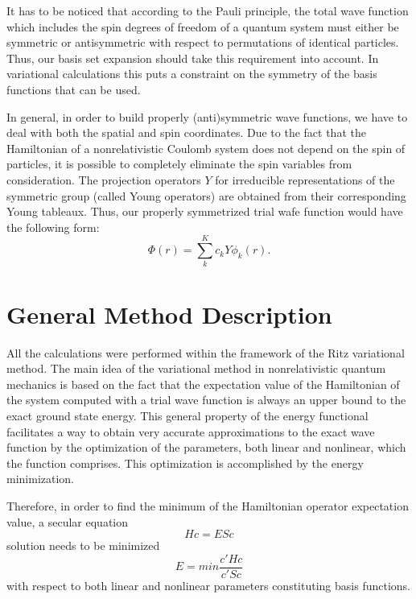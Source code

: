 It has to be noticed that according to the Pauli principle, the total wave function
which includes the spin degrees of freedom of a quantum system must either be symmetric 
or antisymmetric with respect to permutations of identical particles. 
Thus, our basis set expansion should take this requirement into account. 
In variational calculations this puts a constraint on the symmetry of the basis 
functions that can be used. 

In general, in order to build properly (anti)symmetric wave functions, we have to deal 
with both the spatial and spin coordinates. Due to the fact that the Hamiltonian of a
nonrelativistic Coulomb system does not depend on the spin of particles, it is possible 
to completely eliminate the spin variables from consideration. The projection operators
$Y$ for irreducible representations of the symmetric group (called Young operators) are 
obtained from their corresponding Young tableaux. Thus, our properly symmetrized 
trial wafe function would have the following form:
\begin{equation}
\Phi (r) = \sum_k^{K} c_k Y \phi_k(r).
\label{wf_perm}
\end{equation}



\section{General Method Description}

All the calculations were performed within the framework of the Ritz variational method. 
The main idea of the variational method in nonrelativistic quantum mechanics is based on 
the fact that the expectation value of the Hamiltonian of the system computed with a
trial wave function is always an upper bound to the exact ground state energy. 
This general property of the energy functional facilitates a way to obtain very accurate
approximations to the exact wave function by the optimization of the parameters, 
both linear and nonlinear, which the function comprises. This optimization is accomplished 
by the energy minimization. 

Therefore, in order to find the minimum of the Hamiltonian operator expectation value,
a secular equation 
\begin{equation}
Hc = ESc
\label{secular_equation}
\end{equation}
solution needs to be minimized 
\begin{equation}
E = min\frac{c'Hc}{c'Sc}
\label{functional}
\end{equation}
with respect to both linear and nonlinear parameters constituting basis functions.

